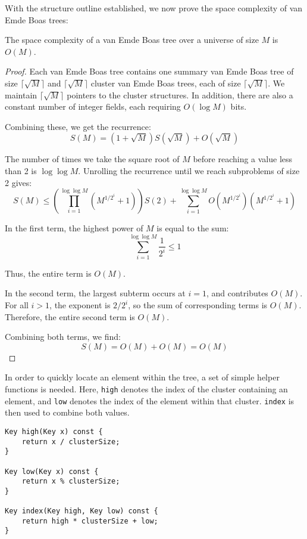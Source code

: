 With the structure outline established, we now prove the space complexity of van Emde Boas trees: 
\begin{lemma}
The space complexity of a van Emde Boas tree over a universe of size \( M \) is \( O(M) \).
\end{lemma}

\begin{proof}
Each van Emde Boas tree contains one summary van Emde Boas tree of size \(\lceil \sqrt{M} \rceil\) and \(\lceil \sqrt{M} \rceil\) cluster van Emde Boas trees, each of size \(\lceil \sqrt{M} \rceil\). We maintain \(\lceil \sqrt{M} \rceil\) pointers to the cluster structures. In addition, there are also a constant number of integer fields, each requiring \(O(\log M)\) bits.

Combining these, we get the recurrence:
\[
S(M) = (1 + \sqrt{M}) S(\sqrt{M}) + O(\sqrt{M})
\]

The number of times we take the square root of \(M\) before reaching a value less than 2 is \(\log \log M\). Unrolling the recurrence until we reach subproblems of size 2 gives:
\[
S(M) \leq \left( \prod_{i=1}^{\log \log M} \left( M^{1/2^i} + 1 \right) \right) S(2) + \sum_{i=1}^{\log \log M} O\left( M^{1/2^i} \right) \left( M^{1/2^i} + 1 \right)
\]

In the first term, the highest power of \(M\) is equal to the sum:
\[
\sum_{i=1}^{\log \log M} \frac{1}{2^i} \leq 1
\]

Thus, the entire term is \(O(M)\).

In the second term, the largest subterm occurs at \(i = 1\), and contributes \(O(M)\). For all \(i > 1\), the exponent is \(2/2^i\), so the sum of corresponding terms is \(O(M)\). Therefore, the entire second term is \(O(M)\).

Combining both terms, we find:
\[
S(M) = O(M) + O(M) = O(M)
\]
\end{proof}

In order to quickly locate an element within the tree, a set of simple helper functions is needed. Here, \texttt{high} denotes the index of the cluster containing an element, and \texttt{low} denotes the index of the element within that cluster. \texttt{index} is then used to combine both values.

\begin{verbatim}
Key high(Key x) const {
    return x / clusterSize;
}

Key low(Key x) const {
    return x % clusterSize;
}

Key index(Key high, Key low) const {
    return high * clusterSize + low;
}
\end{verbatim}

